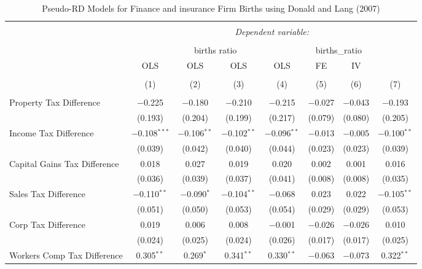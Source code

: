 
\begin{table}[!htbp] \centering 
  \caption{Pseudo-RD Models for  Finance and insurance Firm Births using Donald and Lang (2007)} 
  \label{} 
\begin{tabular}{@{\extracolsep{5pt}}lccccccc} 
\\[-1.8ex]\hline 
\hline \\[-1.8ex] 
 & \multicolumn{7}{c}{\textit{Dependent variable:}} \\ 
\cline{2-8} 
\\[-1.8ex] & \multicolumn{4}{c}{births ratio} & \multicolumn{2}{c}{births\_ratio} &   \\ 
 & OLS & OLS & OLS & OLS & FE & IV &  \\ 
\\[-1.8ex] & (1) & (2) & (3) & (4) & (5) & (6) & (7)\\ 
\hline \\[-1.8ex] 
 Property Tax Difference & $-$0.225 & $-$0.180 & $-$0.210 & $-$0.215 & $-$0.027 & $-$0.043 & $-$0.193 \\ 
  & (0.193) & (0.204) & (0.199) & (0.217) & (0.079) & (0.080) & (0.205) \\ 
  Income Tax Difference & $-$0.108$^{***}$ & $-$0.106$^{**}$ & $-$0.102$^{**}$ & $-$0.096$^{**}$ & $-$0.013 & $-$0.005 & $-$0.100$^{**}$ \\ 
  & (0.039) & (0.042) & (0.040) & (0.044) & (0.023) & (0.023) & (0.039) \\ 
  Capital Gains Tax Difference & 0.018 & 0.027 & 0.019 & 0.020 & 0.002 & 0.001 & 0.016 \\ 
  & (0.036) & (0.039) & (0.037) & (0.041) & (0.008) & (0.008) & (0.035) \\ 
  Sales Tax Difference & $-$0.110$^{**}$ & $-$0.090$^{*}$ & $-$0.104$^{**}$ & $-$0.068 & 0.023 & 0.022 & $-$0.105$^{**}$ \\ 
  & (0.051) & (0.050) & (0.053) & (0.054) & (0.029) & (0.029) & (0.053) \\ 
  Corp Tax Difference & 0.019 & 0.006 & 0.008 & $-$0.001 & $-$0.026 & $-$0.026 & 0.010 \\ 
  & (0.024) & (0.025) & (0.024) & (0.026) & (0.017) & (0.017) & (0.025) \\ 
  Workers Comp Tax Difference & 0.305$^{**}$ & 0.269$^{*}$ & 0.341$^{**}$ & 0.330$^{**}$ & $-$0.063 & $-$0.073 & 0.322$^{**}$ \\ 

\end{tabular}
\end{table}
